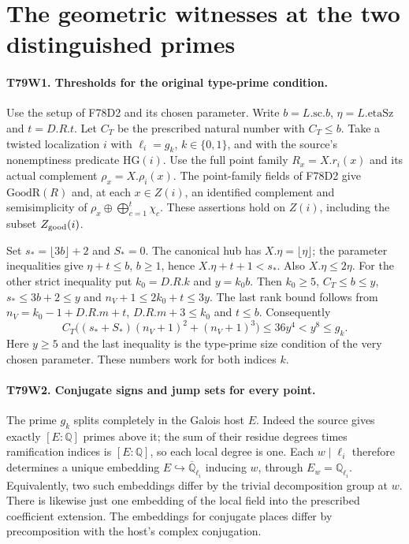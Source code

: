 \section{The geometric witnesses at the two distinguished primes}

\paragraph{T79W1. Thresholds for the original type-prime condition.}
Use the setup of F78D2 and its chosen parameter. Write
$b=L.\mathrm{sc}.b$, $\eta=L.\mathrm{etaSz}$ and $t=D.R.t$.
Let $C_T$ be the prescribed natural number with $C_T\le b$.
Take a twisted localization $i$ with $\ell_i=g_k$, $k\in\{0,1\}$,
and with the source's nonemptiness predicate $\mathrm{HG}(i)$.
Use the full point family $R_x=X.r_i(x)$ and its actual complement
$\rho_x=X.\rho_i(x)$. The point-family fields of F78D2 give
$\mathrm{GoodR}(R)$ and, at each $x\in Z(i)$, an identified
complement and semisimplicity of $\rho_x\oplus\bigoplus_{c=1}^t\chi_c$.
These assertions hold on $Z(i)$, including the subset $Z_{\rm good}(i)$.

Set $s_* =\lfloor3b\rfloor+2$ and $S_*=0$. The canonical hub has
$X.\eta=\lfloor\eta\rfloor$; the parameter inequalities give
$\eta+t\le b$, $b\ge1$, hence $X.\eta+t+1<s_*$. Also
$X.\eta\le2\eta$. For the other strict inequality put $k_0=D.R.k$ and $y=k_0 b$. Then $k_0\ge5$,
$C_T\le b\le y$, $s_*\le3b+2\le y$ and
$n_V+1\le2k_0+t\le3y$. The last rank bound follows from
$n_V=k_0-1+D.R.m+t$, $D.R.m+3\le k_0$ and $t\le b$. Consequently
\[
 C_T\big((s_*+S_*)(n_V+1)^2+(n_V+1)^3\big)
 \le36y^4<y^8\le g_k .
\]
Here $y\ge5$ and the last inequality is the type-prime size condition
of the very chosen parameter. These numbers work for both indices $k$.

\paragraph{T79W2. Conjugate signs and jump sets for every point.}
The prime $g_k$ splits completely in the Galois host $E$. Indeed the
source gives exactly $[E:\mathbb Q]$ primes above it; the sum of their
residue degrees times ramification indices is $[E:\mathbb Q]$,
so each local degree is one. Each $w\mid\ell_i$ therefore determines
a unique embedding $E\hookrightarrow\overline{\mathbb Q}_{\ell_i}$
inducing $w$, through $E_w=\mathbb Q_{\ell_i}$. Equivalently, two such
embeddings differ by the trivial decomposition group at $w$.
There is likewise just one embedding of the local field into the
prescribed coefficient extension. The embeddings for conjugate
places differ by precomposition with the host's complex conjugation.

